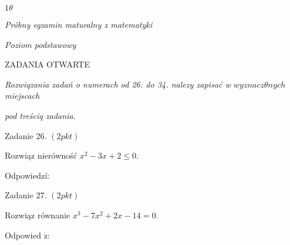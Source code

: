 \documentclass[a4paper,12pt]{article}
\begin{document}
$ 1\theta$

{\it Próbny egzamin maturalny z matematyki}

{\it Poziom podstawowy}

ZADANIA OTWARTE

{\it Rozwiqzania zadań o numerach od 26. do 34. nalezy zapisać w} $wyznacz\theta nych$ {\it miejscach}

{\it pod treściq zadania}.

Zadanie 26. $(2pkt)$

Rozwiąz nierówność $x^{2}-3x+2\leq 0.$

Odpowiedzí:

Zadanie 27. $(2pkt)$

Rozwiąz równanie $x^{3}-7x^{2}+2x-14=0.$

Odpowied $\acute{\mathrm{z}}$:
\end{document}
